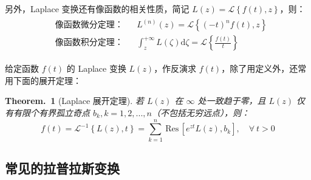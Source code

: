 \documentclass[UTF8]{report}
\def\Res{\mathrm{\,Res\,}}
\theoremstyle{MyLineTheoremStyle} %
\theoremstyle{MyBlockTheoremStyle} %
\newtheorem{BlockTheorem}[LineTheorem]{Theorem.\,} %
\theoremstyle{MySubsubsectionStyle} %
\begin{document}
另外，Laplace 变换还有像函数的相关性质，简记 $L(z) = \mathscr{L}\left\{ f(t), z \right\}$，则：
\begin{gather}
\begin{aligned}
&\text{像函数微分定理：} && L^{(n)}(z) = \mathscr{L}\left\{ (-t)^n f(t), z \right\} \\ 
&\text{像函数积分定理：} && \int_{z}^{+\infty} L(\zeta)\mathrm{d}\zeta = \mathscr{L}\left\{ \frac{f(t)}{t} \right\}
\end{aligned} 
\end{gather}

给定函数 $f(t)$ 的 Laplace 变换 $L(z)$，作反演求 $f(t)$，除了用定义外，还常用下面的展开定理：
\begin{BlockTheorem}[Laplace 展开定理]\label{Laplace 展开定理}
若 $L(z)$ 在 $\infty$ 处一致趋于零，且 $L(z)$ 仅有有限个有界孤立奇点 $b_k, k = 1, 2, ..., n$（不包括无穷远点），则：
\begin{equation}
f(t) = \mathscr{L}^{-1}\left\{ L(z), t \right\} = 
\sum_{k=1}^{n} \Res \left[ e^{zt}L(z), b_k \right],\quad \forall\ t > 0
\end{equation}
\end{BlockTheorem}



\subsection{常见的拉普拉斯变换}
\end{document}
